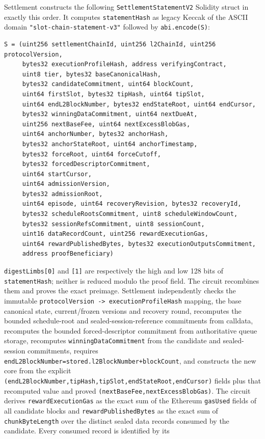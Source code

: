 \documentclass[a4paper,11pt]{article}
\newcommand{\code}[1]{\nolinkurl{#1}}
\begin{document}
Settlement constructs the following \code{SettlementStatementV2} Solidity
struct in exactly this order.  It computes \code{statementHash} as legacy
Keccak of the ASCII domain
\code{"slot-chain-statement-v3"} followed by \code{abi.encode(S)}:
\begin{verbatim}
S = (uint256 settlementChainId, uint256 l2ChainId, uint256 protocolVersion,
     bytes32 executionProfileHash, address verifyingContract,
     uint8 tier, bytes32 baseCanonicalHash,
     bytes32 candidateCommitment, uint64 blockCount,
     uint64 firstSlot, bytes32 tipHash, uint64 tipSlot,
     uint64 endL2BlockNumber, bytes32 endStateRoot, uint64 endCursor,
     bytes32 winningDataCommitment, uint64 nextDueAt,
     uint256 nextBaseFee, uint64 nextExcessBlobGas,
     uint64 anchorNumber, bytes32 anchorHash,
     bytes32 anchorStateRoot, uint64 anchorTimestamp,
     bytes32 forceRoot, uint64 forceCutoff,
     bytes32 forcedDescriptorCommitment,
     uint64 startCursor,
     uint64 admissionVersion,
     bytes32 admissionRoot,
     uint64 episode, uint64 recoveryRevision, bytes32 recoveryId,
     bytes32 scheduleRootsCommitment, uint8 scheduleWindowCount,
     bytes32 sessionRefsCommitment, uint8 sessionCount,
     uint16 dataRecordCount, uint256 rewardExecutionGas,
     uint64 rewardPublishedBytes, bytes32 executionOutputsCommitment,
     address proofBeneficiary)
\end{verbatim}
\code{digestLimbs[0]} and \code{[1]} are respectively the high and low 128 bits
of \code{statementHash}; neither is reduced modulo the proof field.  The circuit
recombines them and proves the exact preimage.  Settlement independently checks
the immutable \code{protocolVersion -> executionProfileHash} mapping, the base
canonical state, current/frozen versions and recovery round, recomputes
the bounded schedule-root and sealed-session-reference commitments from
calldata, recomputes the bounded forced-descriptor commitment from authoritative
queue storage, recomputes \code{winningDataCommitment} from the candidate and
sealed-session commitments, requires
\code{endL2BlockNumber=stored.l2BlockNumber+blockCount}, and constructs the new
core from the explicit
\code{(endL2BlockNumber,tipHash,tipSlot,endStateRoot,endCursor)} fields plus
that recomputed value and proved
\code{(nextBaseFee,nextExcessBlobGas)}.
The circuit derives \code{rewardExecutionGas} as the exact sum of the Ethereum
\code{gasUsed} fields of all candidate blocks and \code{rewardPublishedBytes}
as the exact sum of \code{chunkByteLength} over the distinct sealed data
records consumed by the candidate.  Every consumed record is identified by its
\end{document}
